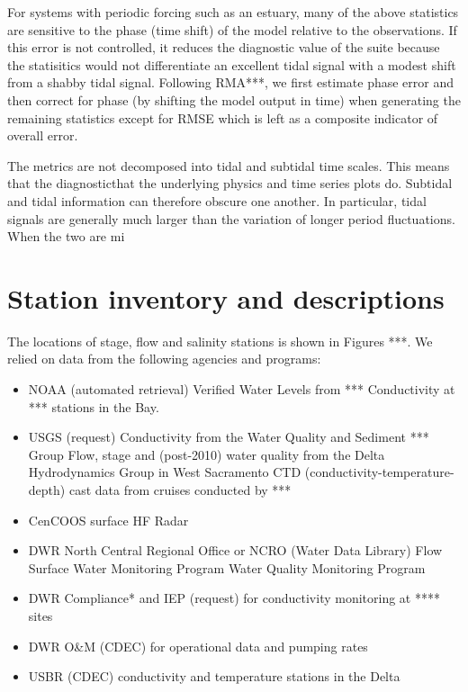 For systems with periodic forcing such as an estuary, many of the above statistics are sensitive to the phase 
(time shift) of the model relative to the observations. If this error is not controlled, 
it reduces the diagnostic value of the suite because the statisitics would not differentiate an excellent
tidal signal with a modest shift from a shabby tidal signal. 
Following  RMA***, we first estimate phase error and then correct for phase (by shifting the model output in time) 
when generating the remaining statistics except for RMSE which is left as a composite indicator of overall error.

The metrics are not decomposed into tidal and subtidal time scales. This means that the diagnosticthat the underlying physics and time series plots do. Subtidal and tidal information can therefore
obscure one another. In particular, tidal signals are generally much larger than the variation
of longer period fluctuations. When the two are mi

\section{Station inventory and descriptions}
The locations of stage, flow and salinity stations is shown in Figures ***. We relied on data from the following agencies and programs:

\begin{itemize}
	\item NOAA (automated retrieval)
	    \subitem Verified Water Levels from ***
			\subitem Conductivity at *** stations in the Bay.
	\item USGS (request)
	    \subitem Conductivity from the Water Quality and Sediment *** Group
			\subitem Flow, stage and (post-2010) water quality from the Delta Hydrodynamics Group in West Sacramento
			\subitem CTD (conductivity-temperature-depth) cast data from cruises conducted by ***
  \item CenCOOS surface HF Radar
	\item DWR North Central Regional Office or NCRO (Water Data Library) 
	    \subitem Flow
			\subitem Surface Water Monitoring Program
			\subitem Water Quality Monitoring Program
	\item DWR Compliance* and IEP (request) for conductivity monitoring at **** sites
	\item DWR O\&M (CDEC) for operational data and pumping rates
	\item USBR (CDEC) conductivity and temperature stations in the Delta
\end{itemize}

